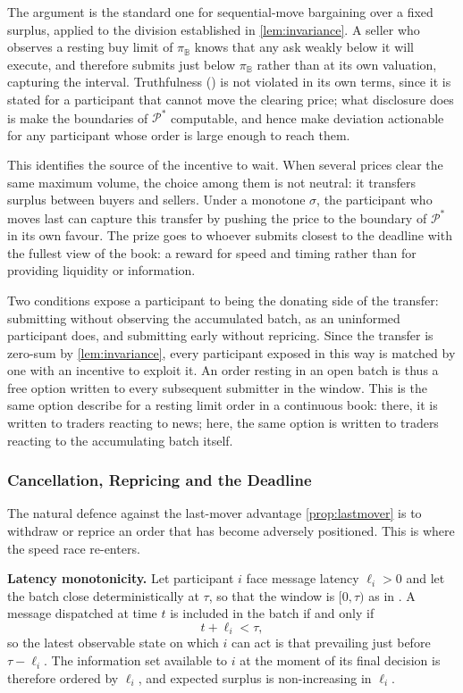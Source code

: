 The argument is the standard one for sequential-move bargaining over a
fixed surplus, applied to the division established in
\eqref{lem:invariance}. A seller who observes a resting buy limit of
$\pi_{\mathbb{B}}$ knows that any ask weakly below it will execute, and
therefore submits just below $\pi_{\mathbb{B}}$ rather than at its own
valuation, capturing the interval. Truthfulness
() is not violated in its own terms, since it is
stated for a participant that cannot move the clearing price; what
disclosure does is make the boundaries of $\mathcal{P}^{*}$ computable, and
hence make deviation actionable for any participant whose order is large
enough to reach them.

This identifies the source of the incentive to wait. When several prices
clear the same maximum volume, the choice among them is not neutral: it
transfers surplus between buyers and sellers. Under a monotone $\sigma$,
the participant who moves last can capture this transfer by pushing the
price to the boundary of $\mathcal{P}^{*}$ in its own favour. The prize
goes to whoever submits closest to the deadline with the fullest view of
the book: a reward for speed and timing rather than for providing
liquidity or information.

Two conditions expose a participant to being the donating side of the
transfer: submitting without observing the accumulated batch, as an
uninformed participant does, and submitting early without repricing. Since
the transfer is zero-sum by \eqref{lem:invariance}, every participant
exposed in this way is matched by one with an incentive to exploit it. An
order resting in an open batch is thus a free option written to every
subsequent submitter in the window. This is the same option
\citet{copeland1983information} describe for a resting limit order in a
continuous book: there, it is written to traders reacting to news; here,
the same option is written to traders reacting to the accumulating batch
itself.

\subsubsection{Cancellation, Repricing and the Deadline}

The natural defence against the last-mover advantage \eqref{prop:lastmover}
is to withdraw or reprice an order that has become adversely positioned.
This is where the speed race re-enters.

\textbf{Latency monotonicity.} Let participant $i$ face message latency
$\ell_i > 0$ and let the batch close deterministically at $\tau$, so that
the window is $[0, \tau)$ as in . A message
dispatched at time $t$ is included in the batch if and only if
\begin{equation}
\label{prop:latency}
  t + \ell_i < \tau,
\end{equation}
so the latest observable state on which $i$ can act is that prevailing
just before $\tau - \ell_i$. The information set available to $i$ at the
moment of its final decision is therefore ordered by $\ell_i$, and
expected surplus is non-increasing in $\ell_i$.

